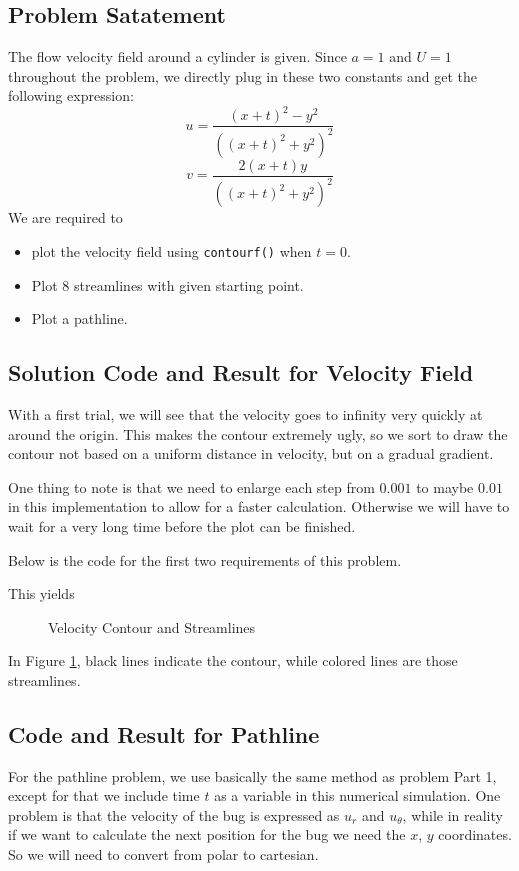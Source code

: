 \documentclass{article}
\begin{document}
  \subsection{Problem Satatement}
  The flow velocity field around a cylinder is given. Since $a = 1$ and $U = 1$ throughout the problem, we directly plug in these two constants and get the following expression:
  $$u = \frac{(x+t)^2 - y^2}{((x+t)^2+y^2)^2}$$
  $$v = \frac{2(x+t)y}{((x+t)^2+y^2)^2}$$
  We are required to
  \begin{itemize}
    \item plot the velocity field using \texttt{contourf()} when $t = 0$.
    \item Plot 8 streamlines with given starting point.
    \item Plot a pathline.
  \end{itemize}
  
  \subsection{Solution Code and Result for Velocity Field}
  With a first trial, we will see that the velocity goes to infinity very quickly at around the origin. This makes the contour extremely ugly, so we sort to draw the contour not based on a uniform distance in velocity, but on a gradual gradient.\par
  One thing to note is that we need to enlarge each step from $0.001$ to maybe $0.01$ in this implementation to allow for a faster calculation. Otherwise we will have to wait for a very long time before the plot can be finished.\par
  Below is the code for the first two requirements of this problem.
  
  This yields 
  \begin{figure}[H]
    \centering
    \noindent{}
    \caption{Velocity Contour and Streamlines} \label{fig:part2}
  \end{figure}
  In Figure \ref{fig:part2}, black lines indicate the contour, while colored lines are those streamlines.\par
  
  \subsection{Code and Result for Pathline}
  For the pathline problem, we use basically the same method as problem Part 1, except for that we include time $t$ as a variable in this numerical simulation. One problem is that the velocity of the bug is expressed as $u_r$ and $u_{\theta}$, while in reality if we want to calculate the next position for the bug we need the $x$, $y$ coordinates. So we will need to convert from polar to cartesian.
  
\end{document}
